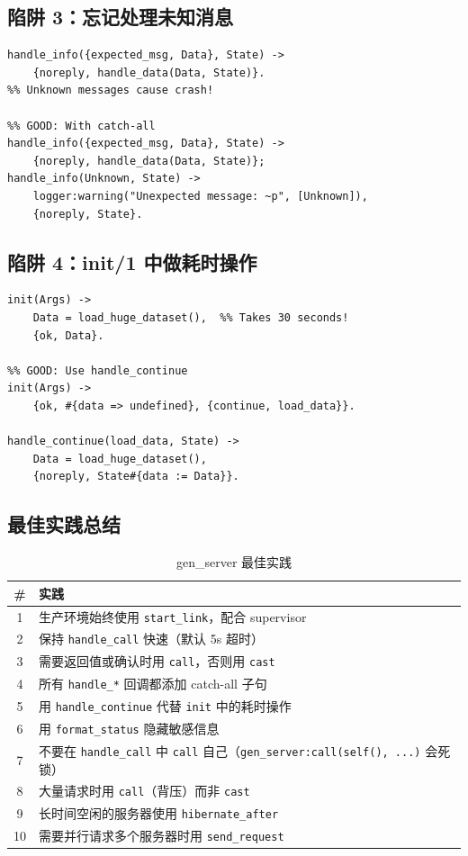 \documentclass[a4paper,11pt]{article}
\begin{document}
\subsection{陷阱 3：忘记处理未知消息}

\begin{lstlisting}[style=erlangstyle, caption={总是添加 catch-all 子句}]
%% BAD: Missing catch-all
handle_info({expected_msg, Data}, State) ->
    {noreply, handle_data(Data, State)}.
%% Unknown messages cause crash!

%% GOOD: With catch-all
handle_info({expected_msg, Data}, State) ->
    {noreply, handle_data(Data, State)};
handle_info(Unknown, State) ->
    logger:warning("Unexpected message: ~p", [Unknown]),
    {noreply, State}.
\end{lstlisting}

\subsection{陷阱 4：init/1 中做耗时操作}

\begin{lstlisting}[style=erlangstyle, caption={init 中的耗时操作会阻塞调用者}]
%% BAD: Blocks the caller of start_link
init(Args) ->
    Data = load_huge_dataset(),  %% Takes 30 seconds!
    {ok, Data}.

%% GOOD: Use handle_continue
init(Args) ->
    {ok, #{data => undefined}, {continue, load_data}}.

handle_continue(load_data, State) ->
    Data = load_huge_dataset(),
    {noreply, State#{data := Data}}.
\end{lstlisting}

\subsection{最佳实践总结}

\begin{table}[H]
\centering
\small
\begin{tabular}{@{}cp{10cm}@{}}
\toprule
\textbf{\#} & \textbf{实践} \\
\midrule
1 & 生产环境始终使用 \texttt{start\_link}，配合 supervisor \\
2 & 保持 \texttt{handle\_call} 快速（默认 5s 超时） \\
3 & 需要返回值或确认时用 \texttt{call}，否则用 \texttt{cast} \\
4 & 所有 \texttt{handle\_*} 回调都添加 catch-all 子句 \\
5 & 用 \texttt{handle\_continue} 代替 \texttt{init} 中的耗时操作 \\
6 & 用 \texttt{format\_status} 隐藏敏感信息 \\
7 & 不要在 \texttt{handle\_call} 中 \texttt{call} 自己（\texttt{gen\_server:call(self(), ...)} 会死锁） \\
8 & 大量请求时用 \texttt{call}（背压）而非 \texttt{cast} \\
9 & 长时间空闲的服务器使用 \texttt{hibernate\_after} \\
10 & 需要并行请求多个服务器时用 \texttt{send\_request} \\
\bottomrule
\end{tabular}
\caption{gen\_server 最佳实践}
\end{table}
\end{document}
